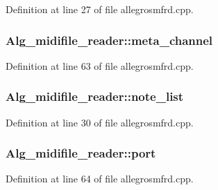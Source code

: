 Definition at line 27 of file allegrosmfrd.\+cpp.

\subsubsection[{\texorpdfstring{meta\+\_\+channel}{meta_channel}}]{ Alg\+\_\+midifile\+\_\+reader\+::meta\+\_\+channel\hspace{0.3cm}{\ttfamily [protected]}}\hypertarget{class_alg__midifile__reader_a6936d54beeeccb85ba7f1791c918e05a}{}\label{class_alg__midifile__reader_a6936d54beeeccb85ba7f1791c918e05a}


Definition at line 63 of file allegrosmfrd.\+cpp.

\subsubsection[{\texorpdfstring{note\+\_\+list}{note_list}}]{ Alg\+\_\+midifile\+\_\+reader\+::note\+\_\+list}\hypertarget{class_alg__midifile__reader_ac86885717955ca45865b7411d32d8070}{}\label{class_alg__midifile__reader_ac86885717955ca45865b7411d32d8070}


Definition at line 30 of file allegrosmfrd.\+cpp.

\subsubsection[{\texorpdfstring{port}{port}}]{ Alg\+\_\+midifile\+\_\+reader\+::port\hspace{0.3cm}{\ttfamily [protected]}}\hypertarget{class_alg__midifile__reader_ac4de4a69968bfc796de980ffc33855ac}{}\label{class_alg__midifile__reader_ac4de4a69968bfc796de980ffc33855ac}


Definition at line 64 of file allegrosmfrd.\+cpp.

